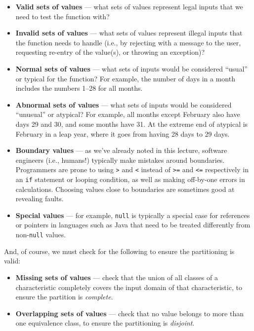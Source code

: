 \begin{itemize}

    \item {\bf Valid sets of values} --- what sets of values represent legal
    inputs that we need to test the function with?
    
    \item {\bf Invalid sets of values} --- what sets of values represent illegal
    inputs that the function needs to handle (i.e., by rejecting with a message
    to the user, requesting re-entry of the value(s), or throwing an exception)?

    \item {\bf Normal sets of values} --- what sets of inputs would be
    considered ``usual'' or typical for the function? For example, the number of
    days in a month includes the numbers 1--28 for all months.

    \item {\bf Abnormal sets of values} --- what sets of inputs would be
    considered ``unusual'' or atypical? For example, all months except February
    also have days 29 and 30, and some months have 31. At the extreme end of
    atypical is February in a leap year, where it goes from having 28 days to 29
    days. 

    \item {\bf Boundary values} --- as we've already noted in this lecture,
    software engineers (i.e., humans!) typically make mistakes around
    boundaries. Programmers are prone to using {\tt >} and {\tt <} instead of
    {\tt >=} and {\tt <=} respectively in an {\tt if} statement or looping
    condition, as well as making off-by-one errors in calculations. Choosing
    values close to boundaries are sometimes good at revealing faults.

    \item {\bf Special values} --- for example, {\tt null} is typically a
    special case for references or pointers in languages such as Java that need
    to be treated differently from non-{\tt null} values.

\end{itemize}    

And, of course, we must check for the following to ensure the partitioning is
valid:

\begin{itemize}

    \item {\bf Missing sets of values} --- check that the union of all classes
    of a characteristic completely covers the input domain of that
    characteristic, to ensure the partition is {\it complete}.
    
    \item {\bf Overlapping sets of values} --- check that no value belongs to
    more than one equivalence class, to ensure the partitioning is {\it
    disjoint}.
    
\end{itemize}

